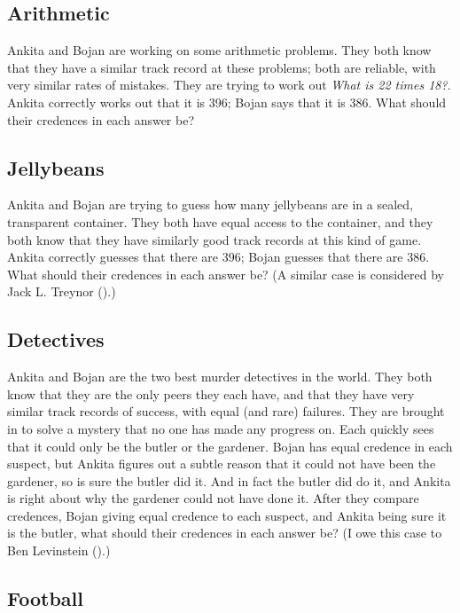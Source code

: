 \documentclass[
  10pt,
  letterpaper,
  twoside]{scrbook}
\begin{document}
\subsection{Arithmetic}\label{arithmetic}

{Ankita} and {Bojan} are working on some arithmetic problems. They both
know that they have a similar track record at these problems; both are
reliable, with very similar rates of mistakes. They are trying to work
out \emph{What is 22 times 18?}. {Ankita} correctly works out that it is
396; {Bojan} says that it is 386. What should their credences in each
answer be?

\subsection{Jellybeans}\label{jellybeans}

{Ankita} and {Bojan} are trying to guess how many jellybeans are in a
sealed, transparent container. They both have equal access to the
container, and they both know that they have similarly good track
records at this kind of game. {Ankita} correctly guesses that there are
396; {Bojan} guesses that there are 386. What should their credences in
each answer be? (A similar case is considered by Jack L. Treynor
().)

\subsection{Detectives}\label{detectives}

{Ankita} and {Bojan} are the two best murder detectives in the world.
They both know that they are the only peers they each have, and that
they have very similar track records of success, with equal (and rare)
failures. They are brought in to solve a mystery that no one has made
any progress on. Each quickly sees that it could only be the butler or
the gardener. {Bojan} has equal credence in each suspect, but {Ankita}
figures out a subtle reason that it could not have been the gardener, so
is sure the butler did it. And in fact the butler did do it, and
{Ankita} is right about why the gardener could not have done it. After
they compare credences, {Bojan} giving equal credence to each suspect,
and {Ankita} being sure it is the butler, what should their credences in
each answer be? (I owe this case to Ben Levinstein
().)

\subsection{Football}\label{football}
\end{document}
